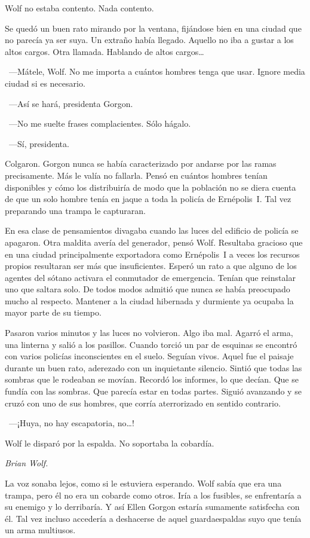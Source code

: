 Wolf no estaba contento. Nada contento.

Se quedó un buen rato mirando por la ventana, fijándose bien en una ciudad que no parecía ya ser suya. Un extraño había llegado. Aquello no iba a gustar a los altos cargos. Otra llamada. Hablando de altos cargos\dots

~---Mátele, Wolf. No me importa a cuántos hombres tenga que usar. Ignore media ciudad si es necesario.

~---Así se hará, presidenta Gorgon.

~---No me suelte frases complacientes. Sólo hágalo.

~---Sí, presidenta.

Colgaron. Gorgon nunca se había caracterizado por andarse por las ramas precisamente. Más le valía no fallarla. Pensó en cuántos hombres tenían disponibles y cómo los distribuiría de modo que la población no se diera cuenta de que un solo hombre tenía en jaque a toda la policía de Ernépolis~I. Tal vez preparando una trampa le capturaran.

En esa clase de pensamientos divagaba cuando las luces del edificio de policía se apagaron. Otra maldita avería del generador, pensó Wolf. Resultaba gracioso que en una ciudad principalmente exportadora como Ernépolis~I a veces los recursos propios resultaran ser más que insuficientes. Esperó un rato a que alguno de los agentes del sótano activara el conmutador de emergencia. Tenían que reinstalar uno que saltara solo. De todos modos admitió que nunca se había preocupado mucho al respecto. Mantener a la ciudad hibernada y durmiente ya ocupaba la mayor parte de su tiempo.

Pasaron varios minutos y las luces no volvieron. Algo iba mal. Agarró el arma, una linterna y salió a los pasillos. Cuando torció un par de esquinas se encontró con varios policías inconscientes en el suelo. Seguían vivos. Aquel fue el paisaje durante un buen rato, aderezado con un inquietante silencio. Sintió que todas las sombras que le rodeaban se movían. Recordó los informes, lo que decían. Que se fundía con las sombras. Que parecía estar en todas partes. Siguió avanzando y se cruzó con uno de sus hombres, que corría aterrorizado en sentido contrario.

~---¡Huya, no hay escapatoria, no\dots!

Wolf le disparó por la espalda. No soportaba la cobardía.

\emph{Brian Wolf.}

La voz sonaba lejos, como si le estuviera esperando. Wolf sabía que era una trampa, pero él no era un cobarde como otros. Iría a los fusibles, se enfrentaría a su enemigo y lo derribaría. Y así Ellen Gorgon estaría sumamente satisfecha con él. Tal vez incluso accedería a deshacerse de aquel guardaespaldas suyo que tenía un arma multiusos.

